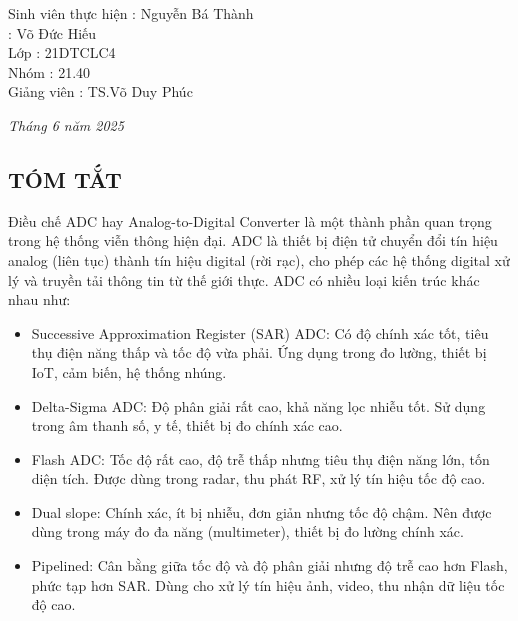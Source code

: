 \documentclass[a4paper,13pt]{article}
\begin{document}
\begin{titlepage}
\begin{flushleft}
\hspace{4cm}Sinh viên thực hiện \hspace{0.05cm}: Nguyễn Bá Thành \\
\hspace{8.13cm}: Võ Đức Hiếu \\
\hspace{4cm}Lớp \hspace{3.2cm}: 21DTCLC4 \\
\hspace{4cm}Nhóm \hspace{2.7cm}: 21.40 \\
\hspace{4cm}Giảng viên \hspace{1.8cm}: TS.Võ Duy Phúc \\
\end{flushleft}
\vspace{3cm}
\begin{center}
    \textit{Tháng 6 năm 2025}
\end{center}
\end{titlepage}

\begin{center}
\section{TÓM TẮT}
\end{center}
Điều chế ADC hay Analog-to-Digital Converter là một thành phần quan trọng trong hệ thống viễn thông hiện đại. ADC là thiết bị điện tử chuyển đổi tín hiệu analog (liên tục) thành tín hiệu digital (rời rạc), cho phép các hệ thống digital xử lý và truyền tải thông tin từ thế giới thực. ADC có nhiều loại kiến trúc khác nhau như: \\

\begin{itemize}
    \item Successive Approximation Register (SAR) ADC: Có độ chính xác tốt, tiêu thụ điện năng thấp và tốc độ vừa phải. Ứng dụng trong đo lường, thiết bị IoT, cảm biến, hệ thống nhúng.
    \item Delta-Sigma ADC: Độ phân giải rất cao, khả năng lọc nhiễu tốt. Sử dụng trong âm thanh số, y tế, thiết bị đo chính xác cao.
    \item Flash ADC: Tốc độ rất cao, độ trễ thấp nhưng tiêu thụ điện năng lớn, tốn diện tích. Được dùng trong radar, thu phát RF, xử lý tín hiệu tốc độ cao.
    \item Dual slope: Chính xác, ít bị nhiễu, đơn giản nhưng tốc độ chậm. Nên được dùng trong máy đo đa năng (multimeter), thiết bị đo lường chính xác.
    \item Pipelined: Cân bằng giữa tốc độ và độ phân giải nhưng độ trễ cao hơn Flash, phức tạp hơn SAR. Dùng cho xử lý tín hiệu ảnh, video, thu nhận dữ liệu tốc độ cao.
\end{itemize}
\end{document}
